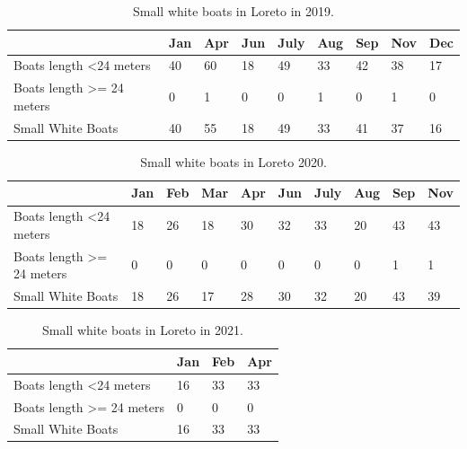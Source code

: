 \begin{table}[h!]
\begin{tabular}{|l|l|l|l|l|l|l|l|l|}
\hline
                                       & Jan & Apr & Jun & July & Aug & Sep & Nov & Dec \\ \hline
Boats length \textless 24 meters       & 40  & 60  & 18  & 49   & 33  & 42  & 38  & 17  \\ \hline
Boats length \textgreater{}= 24 meters & 0   & 1   & 0   & 0    & 1   & 0   & 1   & 0   \\ \hline
Small White Boats                      & 40  & 55  & 18  & 49   & 33  & 41  & 37  & 16  \\ \hline
\end{tabular}
\caption{Small white boats in Loreto in 2019.}
\end{table}


\begin{table}[h!]
\begin{tabular}{|l|l|l|l|l|l|l|l|l|l|}
\hline
                                       & Jan & Feb & Mar & Apr & Jun & July & Aug & Sep & Nov \\ \hline
Boats length \textless 24 meters       & 18  & 26  & 18  & 30  & 32  & 33   & 20  & 43  & 43  \\ \hline
Boats length \textgreater{}= 24 meters & 0   & 0   & 0   & 0   & 0   & 0    & 0   & 1   & 1   \\ \hline
Small White Boats                      & 18  & 26  & 17  & 28  & 30  & 32   & 20  & 43  & 39  \\ \hline
\end{tabular}
\caption{Small white boats in Loreto 2020.}
\end{table}



\begin{table}[h!]
\begin{tabular}{|l|l|l|l|}
\hline
                                       & Jan & Feb & Apr \\ \hline
Boats length \textless 24 meters       & 16  & 33  & 33  \\ \hline
Boats length \textgreater{}= 24 meters & 0   & 0   & 0   \\ \hline
Small White Boats                      & 16  & 33  & 33  \\ \hline
\end{tabular}
\caption{Small white boats in Loreto in 2021.}
\end{table}



